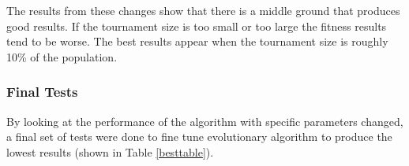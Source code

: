 \documentclass[sigconf]{acmart}
\begin{document}
\begin{table}[!h]
	\caption{Tournament Sizes}
	\label{selecttable}
	\centering
\end{table}

The results from these changes show that there is a middle ground that produces good results. If the tournament size is too small or too large the fitness results tend to be worse. The best results appear when the tournament size is roughly 10\% of the population.

\subsubsection{Final Tests}
By looking at the performance of the algorithm with specific parameters changed, a final set of tests were done to fine tune evolutionary algorithm to produce the lowest results (shown in Table \ref{besttable}).
\end{document}
